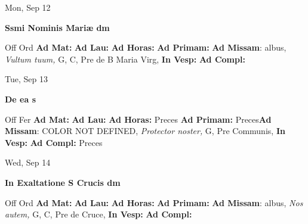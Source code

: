 \documentclass[10pt]{memoir}
\begin{document}
\begin{center}
\begin{minipage}{3.5in}
\vspace{2em}
\begin{center}Mon, Sep 12
\end{center}
\textbf{ \large Ssmi Nominis Mariæ
\textnormal{\normalsize dm}}

\begin{justify}Off Ord
\textbf{Ad Mat: }
\textbf{Ad Lau: }
\textbf{Ad Horas: }
\textbf{Ad Primam: }\textbf{Ad Missam}: albus, \textit{Vultum tuum,} G, C, Pre de B Maria Virg, 
\textbf{In Vesp: }
\textbf{Ad Compl: }
\end{justify}
\end{minipage}
\end{center}

\begin{center}
\begin{minipage}{3.5in}
\vspace{2em}
\begin{center}Tue, Sep 13
\end{center}
\textbf{ \large De ea
\textnormal{\normalsize s}}

\begin{justify}Off Fer
\textbf{Ad Mat: }
\textbf{Ad Lau: }
\textbf{Ad Horas: }Preces
\textbf{Ad Primam: }Preces\textbf{Ad Missam}: COLOR NOT DEFINED, \textit{Protector noster,} G, Pre Communis, 
\textbf{In Vesp: }
\textbf{Ad Compl: }Preces
\end{justify}
\end{minipage}
\end{center}

\begin{center}
\begin{minipage}{3.5in}
\vspace{2em}
\begin{center}Wed, Sep 14
\end{center}
\textbf{ \large In Exaltatione S Crucis
\textnormal{\normalsize dm}}

\begin{justify}Off Ord
\textbf{Ad Mat: }
\textbf{Ad Lau: }
\textbf{Ad Horas: }
\textbf{Ad Primam: }\textbf{Ad Missam}: albus, \textit{Nos autem,} G, C, Pre de Cruce, 
\textbf{In Vesp: }
\textbf{Ad Compl: }
\end{justify}
\end{minipage}
\end{center}
\end{document}
